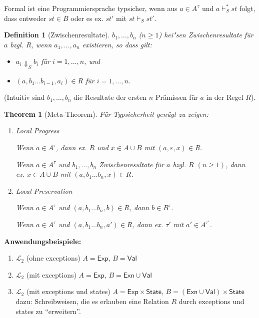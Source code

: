 \documentclass[12pt,a2paper,draft]{article}
\newtheorem{theorem}{Theorem}
\newtheorem{definition}{Definition}
\begin{document}
Formal ist eine Programmiersprache typsicher, wenn aus $a \in A^\tau$ und $a \vdash^*_S st$ folgt,
dass entweder $st \in B$ oder es ex. $st'$ mit $st \vdash_S st'$.

\begin{definition}[Zwischenresultate]
  $b_1,\ldots,b_n$ ($n \ge 1$) hei"sen \emph{Zwischenresultate} f\"ur $a$ bzgl. $R$, wenn
  $a_1,\ldots,a_n$ existieren, so dass gilt:
  \begin{itemize}
  \item $a_i \Downarrow_S b_i$ f\"ur $i=1,\ldots,n$, und
  \item $(a,b_1 \ldots b_{i-1}, a_i) \in R$ f\"ur $i = 1,\ldots,n$.
  \end{itemize}
\end{definition}

\noindent
(Intuitiv sind $b_1,\ldots,b_n$ die Resultate der ersten $n$ Pr\"amissen f\"ur $a$ in der
Regel $R$).

\begin{theorem}[Meta-Theorem]
  F\"ur Typsicherheit gen\"ugt zu zeigen:
  \begin{enumerate}
  \item \emph{Local Progress}

    Wenn $a \in A^\tau$, dann ex. $R$ und $x \in A \cup B$ mit $(a,\varepsilon,x) \in R$.

    Wenn $a \in A^\tau$ und $b_1,\ldots,b_n$ Zwischenresultate f\"ur $a$ bzgl. $R$ $(n \ge 1)$,
    dann ex. $x \in A \cup B$ mit $(a,b_1 \ldots b_n,x) \in R$.

  \item \emph{Local Preservation}

    Wenn $a \in A^\tau$ und $(a,b_1 \ldots b_n,b) \in R$, dann $b \in B^\tau$.

    Wenn $a \in A^\tau$ und $(a,b_1 \ldots b_n,a') \in R$, dann ex. $\tau'$ mit $a' \in A^{\tau'}$.
  \end{enumerate}
\end{theorem}

\noindent
\textbf{Anwendungsbeispiele:}
\begin{enumerate}
\item $\mathcal{L}_2$ (ohne exceptions) $A = \textsf{Exp}$, $B = \textsf{Val}$
\item $\mathcal{L}_2$ (mit exceptions) $A = \textsf{Exp}$, $B = \textsf{Exn} \cup \textsf{Val}$
\item $\mathcal{L}_2$ (mit exceptions und states) $A = \textsf{Exp} \times \textsf{State}$,
  $B = (\textsf{Exn} \cup \textsf{Val}) \times \textsf{State}$ \\
  dazu: Schreibweisen, die es erlauben eine Relation $R$ durch exceptions und states
  zu ``erweitern''.
\end{enumerate}

%
%
\end{document}

